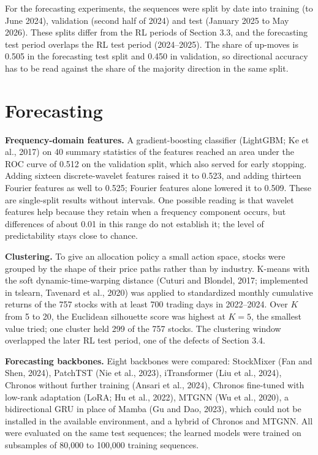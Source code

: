 \documentclass[12pt,a4paper]{report}
\begin{document}
For the forecasting experiments, the sequences were split by date into
training (to June 2024), validation (second half of 2024) and test
(January 2025 to May 2026). These splits differ from the RL periods of
Section 3.3, and the forecasting test period overlaps the RL test period
(2024--2025). The share of up-moves is 0.505 in the forecasting test
split and 0.450 in validation, so directional accuracy has to be read
against the share of the majority direction in the same split.

\section{Forecasting}\label{forecasting}

\textbf{Frequency-domain features.} A gradient-boosting classifier
(LightGBM; Ke et al., 2017) on 40 summary statistics of the features
reached an area under the ROC curve of 0.512 on the validation split,
which also served for early stopping. Adding sixteen discrete-wavelet
features raised it to 0.523, and adding thirteen Fourier features as
well to 0.525; Fourier features alone lowered it to 0.509. These are
single-split results without intervals. One possible reading is that
wavelet features help because they retain when a frequency component
occurs, but differences of about 0.01 in this range do not establish it;
the level of predictability stays close to chance.

\textbf{Clustering.} To give an allocation policy a small action space,
stocks were grouped by the shape of their price paths rather than by
industry. K-means with the soft dynamic-time-warping distance (Cuturi
and Blondel, 2017; implemented in tslearn, Tavenard et al., 2020) was
applied to standardized monthly cumulative returns of the 757 stocks
with at least 700 trading days in 2022--2024. Over \(K\) from 5 to 20,
the Euclidean silhouette score was highest at \(K = 5\), the smallest
value tried; one cluster held 299 of the 757 stocks. The clustering
window overlapped the later RL test period, one of the defects of
Section 3.4.

\textbf{Forecasting backbones.} Eight backbones were compared:
StockMixer (Fan and Shen, 2024), PatchTST (Nie et al., 2023),
iTransformer (Liu et al., 2024), Chronos without further training
(Ansari et al., 2024), Chronos fine-tuned with low-rank adaptation
(LoRA; Hu et al., 2022), MTGNN (Wu et al., 2020), a bidirectional GRU in
place of Mamba (Gu and Dao, 2023), which could not be installed in the
available environment, and a hybrid of Chronos and MTGNN. All were
evaluated on the same test sequences; the learned models were trained on
subsamples of 80,000 to 100,000 training sequences.
\end{document}
